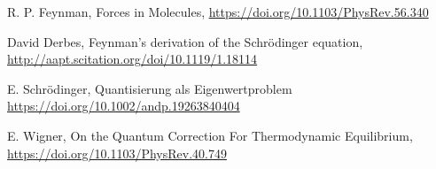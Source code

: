 \item
  R. P. Feynman,
  Forces in Molecules,
  \url{https://doi.org/10.1103/PhysRev.56.340}
\item
  David Derbes,
  Feynman’s derivation of the Schrödinger equation,
  \url{http://aapt.scitation.org/doi/10.1119/1.18114}
\item
  E. Schrödinger,
  Quantisierung als Eigenwertproblem
  \url{https://doi.org/10.1002/andp.19263840404}

\item
  E. Wigner,
  On the Quantum Correction For Thermodynamic Equilibrium,
  \url{https://doi.org/10.1103/PhysRev.40.749}

